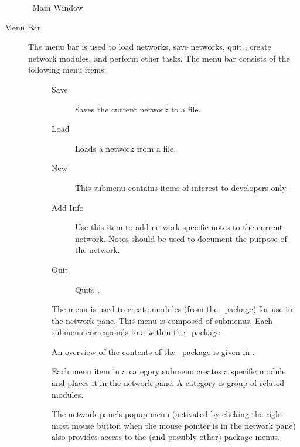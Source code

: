 \begin{figure}[htb]
  \begin{makeimage}
  \end{makeimage}
  \srwindow
  \caption{\label{fig:srwindow} \sr\ Main Window}
\end{figure}

\begin{description}
\item[Menu Bar] The menu bar is used to load networks, save networks, quit
  \sr, create network modules, and perform other tasks.  The menu bar
  consists of the following menu items:

  \begin{description}
  \item[] 
    \begin{description}
    \item[Save] Saves the current network to a file.
    \item[Load] Loads a network from a file.
    \item[New] This submenu contains items of interest to developers only.
    \item[Add Info] Use this item to add network specific notes to
      the current network.  Notes should be used to document the purpose of
      the network.
    \item[Quit] Quits \sr.
    \end{description}
  \end{description}
  
  \begin{description}
  \item[] The  menu is used to create modules
    (from the \sr\ package) for use in the network pane.  This menu is
    composed of submenus. Each submenu corresponds to a 
     within the \sr\ package. 
    
    An overview of the contents of the \sr\ package is given in .

    Each menu item in a category submenu creates a specific module and
    places it in the network pane.  A category is group of related modules.
    
    The network pane's popup menu (activated by clicking the right most
    mouse button when the mouse pointer is in the network pane) also
    provides access to the  (and possibly other) package
    menus.
  \end{description}


\end{description}
